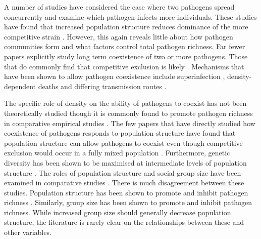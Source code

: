 A number of studies have considered the case where two pathogens spread concurrently and examine which pathogen infects more individuals.
These studies have found that increased population structure reduces dominance of the more competitive strain \cite{van2014domination, poletto2013host, poletto2015characterising}.
However, this again reveals little about how pathogen communities form and what factors control total pathogen richness.
Far fewer papers explicitly study long term coexistence of two or more pathogens.
Those that do commonly find that competitive exclusion is likely \cite{castillo1995dynamics, bremermann1989competitive, martcheva2013competitive, ackleh2003competitive, ackleh2014robust, turner2002impact}.
Mechanisms that have been shown to allow pathogen coexistence include superinfection \cite{may1994superinfection, li2010age}, density-dependent deaths \cite{ackleh2003competitive, kirupaharan2004coexistence} and differing transmission routes \cite{allen2003dynamics}.

The specific role of density on the ability of pathogens to coexist has not been theoretically studied though it is commonly found to promote pathogen richness in comparative empirical studies \cite{kamiya2014determines, nunn2003comparative, arneberg2002host}.
The few papers that have directly studied how coexistence of pathogens responds to population structure have found that population structure can allow pathogens to coexist even though competitive exclusion would occur in a fully mixed population \cite{qiu2013vector, allen2004sis, nunes2006localized}.
Furthermore, genetic diversity has been shown to be maximised at intermediate levels of population structure \cite{campos2006pathogen}.
The roles of population structure and social group size have been examined in comparative studies \cite{maganga2014bat, gay2014parasite, turmelle2009correlates, altizer2003social, bordes2007rodent, ezenwa2006host, rifkin2012animals, vitone2004body}.
There is much disagreement between these studies.
Population structure has been shown to promote \cite{maganga2014bat, turmelle2009correlates} and inhibit pathogen richness \cite{gay2014parasite}.
Similarly, group size has been shown to promote \cite{rifkin2012animals, bordes2007rodent} and inhibit \cite{ezenwa2006host} pathogen richness.
While increased group size should generally decrease population structure, the literature is rarely clear on the relationships between these and other variables.



